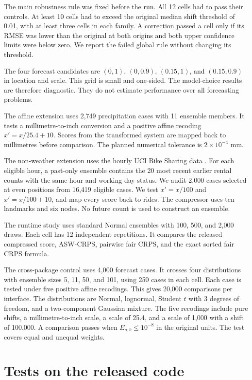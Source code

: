 \documentclass[11pt]{article}
\begin{document}
The main robustness rule was fixed before the run. All 12 cells had to pass their controls. At least 10 cells had to exceed the original median shift threshold of 0.01, with at least three cells in each family. A correction passed a cell only if its RMSE was lower than the original at both origins and both upper confidence limits were below zero. We report the failed global rule without changing its threshold.

The four forecast candidates are $(0,1)$, $(0,0.9)$, $(0.15,1)$, and $(0.15,0.9)$ in location and scale. This grid is small and one-sided. The model-choice results are therefore diagnostic. They do not estimate performance over all forecasting problems.

The affine extension uses 2,749 precipitation cases with 11 ensemble members. It tests a millimetre-to-inch conversion and a positive affine recoding $x'=x/25.4+10$. Scores from the transformed system are mapped back to millimetres before comparison. The planned numerical tolerance is $2\times10^{-4}$ mm.

The non-weather extension uses the hourly UCI Bike Sharing data \cite{bike}. For each eligible hour, a past-only ensemble contains the 20 most recent earlier rental counts with the same hour and working-day status. We audit 2,000 cases selected at even positions from 16,419 eligible cases. We test $x'=x/100$ and $x'=x/100+10$, and map every score back to rides. The compressor uses ten landmarks and six nodes. No future count is used to construct an ensemble.

The runtime study uses standard Normal ensembles with 100, 500, and 2,000 draws. Each cell has 12 independent repetitions. It compares the released compressed score, ASW-CRPS, pairwise fair CRPS, and the exact sorted fair CRPS formula.

The cross-package control uses 4,000 forecast cases. It crosses four distributions with ensemble sizes 5, 11, 50, and 101, using 250 cases in each cell. Each case is tested under five positive affine recodings. This gives 20,000 comparisons per interface. The distributions are Normal, lognormal, Student $t$ with 3 degrees of freedom, and a two-component Gaussian mixture. The five recodings include pure shifts, a millimetre-to-inch scale, a scale of 25.4, and a scale of 1,000 with a shift of 100,000. A comparison passes when $E_{a,b}\leq10^{-8}$ in the original units. The test covers equal and unequal weights.

\section{Tests on the released code}
\end{document}
